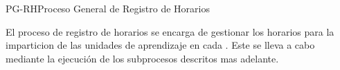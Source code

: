 \begin{procesoGeneral}{PG-RH}{Proceso General  de Registro de Horarios} {
		
	El proceso de registro de horarios se encarga de gestionar los horarios para la imparticion de las unidades de aprendizaje en cada . Este se lleva a cabo mediante la ejecución de los subprocesos descritos mas adelante.\\
	
	
	
	
	
	
	
	
}
\end{procesoGeneral}
